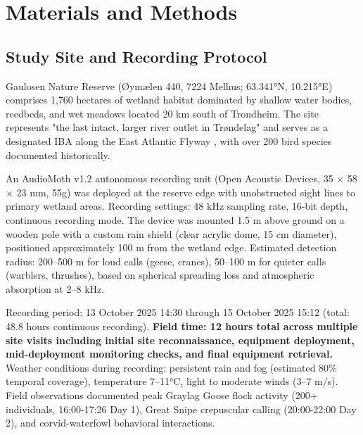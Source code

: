 \documentclass[english,twocolumn]{article}
\begin{document}
\section{Materials and Methods}

\subsection{Study Site and Recording Protocol}

Gaulosen Nature Reserve (Øymælen 440, 7224 Melhus; 63.341°N, 10.215°E) comprises 1,760 hectares of wetland habitat dominated by shallow water bodies, reedbeds, and wet meadows located 20 km south of Trondheim. The site represents "the last intact, larger river outlet in Trøndelag" and serves as a designated IBA along the East Atlantic Flyway \citep{BirdLife2024}, with over 200 bird species documented historically.

An AudioMoth v1.2 autonomous recording unit (Open Acoustic Devices, 35 × 58 × 23 mm, 55g) was deployed at the reserve edge with unobstructed sight lines to primary wetland areas. Recording settings: 48 kHz sampling rate, 16-bit depth, continuous recording mode. The device was mounted 1.5 m above ground on a wooden pole with a custom rain shield (clear acrylic dome, 15 cm diameter), positioned approximately 100 m from the wetland edge. Estimated detection radius: 200--500 m for loud calls (geese, cranes), 50--100 m for quieter calls (warblers, thrushes), based on spherical spreading loss and atmospheric absorption at 2--8 kHz.

Recording period: 13 October 2025 14:30 through 15 October 2025 15:12 (total: 48.8 hours continuous recording). \textbf{Field time: 12 hours total across multiple site visits including initial site reconnaissance, equipment deployment, mid-deployment monitoring checks, and final equipment retrieval.} Weather conditions during recording: persistent rain and fog (estimated 80\% temporal coverage), temperature 7--11°C, light to moderate winds (3--7 m/s). Field observations documented peak Graylag Goose flock activity (200+ individuals, 16:00-17:26 Day 1), Great Snipe crepuscular calling (20:00-22:00 Day 2), and corvid-waterfowl behavioral interactions.
\end{document}
